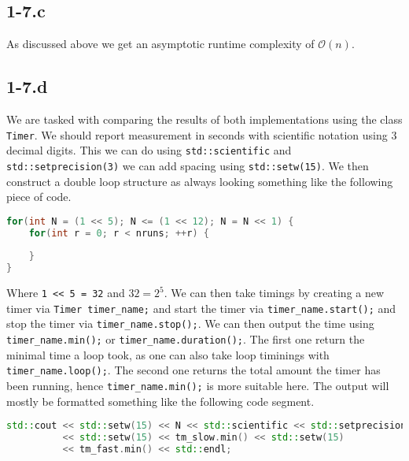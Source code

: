 \documentclass{article}
\begin{document}
\subsection*{1-7.c}
As discussed above we get an asymptotic runtime complexity of $\mathcal{O}\left(n\right)$.

\subsection*{1-7.d}
We are tasked with comparing the results of both implementations using the class \verb|Timer|. We should report measurement in seconds with scientific notation using 3 decimal digits. This we can do using \verb|std::scientific| and \verb|std::setprecision(3)| we can add spacing using \verb|std::setw(15)|. We then construct a double loop structure as always looking something like the following piece of code.

\begin{lstlisting}[language=C++,
                   directivestyle={\color{black}}
                   emph={int,char,double,float,unsigned},
                   emphstyle={\color{blue}}
                  ]
for(int N = (1 << 5); N <= (1 << 12); N = N << 1) {
    for(int r = 0; r < nruns; ++r) {
        
    }
}
\end{lstlisting}
Where \verb|1 << 5 = 32| and $32 = 2^{5}$. We can then take timings by creating a new timer via \verb|Timer timer_name;| and start the timer via \verb|timer_name.start();| and stop the timer via \verb|timer_name.stop();|. We can then output the time using \verb|timer_name.min();| or \verb|timer_name.duration();|. The first one return the minimal time a loop took, as one can also take loop timinings with \verb|timer_name.loop();|. The second one returns the total amount the timer has been running, hence \verb|timer_name.min();| is more suitable here. The output will mostly be formatted something like the following code segment.

\begin{lstlisting}[language=C++,
                   directivestyle={\color{black}}
                   emph={int,char,double,float,unsigned},
                   emphstyle={\color{blue}}
                  ]
std::cout << std::setw(15) << N << std::scientific << std::setprecision(3)
          << std::setw(15) << tm_slow.min() << std::setw(15)
          << tm_fast.min() << std::endl;
\end{lstlisting}

\pagebreak
\end{document}
